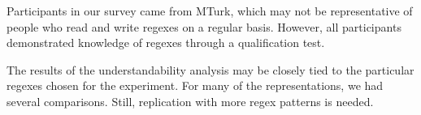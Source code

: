 Participants in our survey came from MTurk, which may not be representative of people who read and write regexes on a regular basis. However, all participants demonstrated knowledge of regexes through a qualification test. 


The results of the understandability analysis may be closely tied to the particular regexes chosen for the experiment. For many of the representations, we had several comparisons. Still, replication with more regex patterns is needed.%


